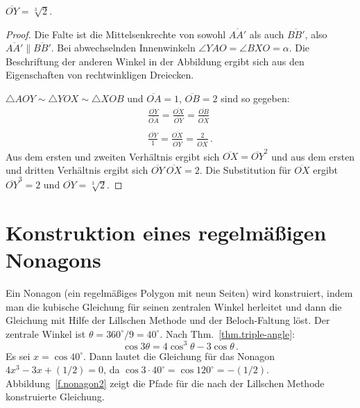 \begin{theorem}
$\overline{OY}=\sqrt[3]{2}$.
\end{theorem}
\begin{proof}
Die Falte ist die Mittelsenkrechte von sowohl $\overline{AA'}$ als auch $\overline{BB'}$, also $\overline{AA'}\parallel\overline{BB'}$. Bei abwechselnden Innenwinkeln $\angle YAO =\angle BXO=\alpha$. Die Beschriftung der anderen Winkel in der Abbildung ergibt sich aus den Eigenschaften von rechtwinkligen Dreiecken.

$\triangle AOY\sim \triangle YOX \sim \triangle XOB$ und $\overline{OA}=1$, $\overline{OB}=2$ sind so gegeben:
\[
\begin{array}{l}
\displaystyle\frac{\overline{OY}}{\overline{OA}}=\displaystyle\frac{\overline{OX}}{\overline{OY}}=\displaystyle\frac{\overline{OB}}{\overline{OX}}\\
\\
\displaystyle\frac{\overline{OY}}{1}=\displaystyle\frac{\overline{OX}}{\overline{OY}}=\displaystyle\frac{2}{\overline{OX}}\,.
\end{array}
\]
Aus dem ersten und zweiten Verhältnis ergibt sich $\overline{OX}=\overline{OY}^2$ und aus dem ersten und dritten Verhältnis ergibt sich $\overline{OY}\:\overline{OX}=2$.
Die Substitution für $\overline{OX}$ ergibt $\overline{OY}^3=2$ und
$\overline{OY}=\sqrt[3]{2}$.
\end{proof}


\section{Konstruktion eines regelmäßigen Nonagons}\label{s.nonagon}


Ein Nonagon (ein regelmäßiges Polygon mit neun Seiten) wird konstruiert, indem man die kubische Gleichung für seinen zentralen Winkel herleitet und dann die Gleichung mit Hilfe der Lillschen Methode und der Beloch-Faltung löst. Der zentrale Winkel ist $\theta=360^\circ/9=40^\circ$. Nach Thm.~\ref{thm.triple-angle}:
\[
\cos 3\theta=4\cos^3 \theta -3\cos\theta\,.
\]
Es sei $x=\cos 40^{\circ}$. Dann lautet die Gleichung für das Nonagon $4x^3-3x+(1/2)=0$, da $\cos 3\cdot 40^\circ=\cos 120^\circ=-(1/2)$. Abbildung~\ref{f.nonagon2} zeigt die Pfade für die nach der Lillschen Methode konstruierte Gleichung.

